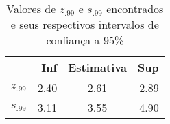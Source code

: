 \begin{table}[ht]
\centering
\caption{Valores de $z_{.99}$ e $s_{.99}$ encontrados e seus
	respectivos intervalos de confian\c ca a 95\%} 
\label{tab:tabevtAAPL2}
\begin{tabular}{rrcr}
  \hline
 & Inf & Estimativa & Sup \\ 
  \hline
$z_{.99}$ & 2.40 & 2.61 & 2.89 \\ 
  $s_{.99}$ & 3.11 & 3.55 & 4.90 \\ 
   \hline
\end{tabular}

\end{table}
